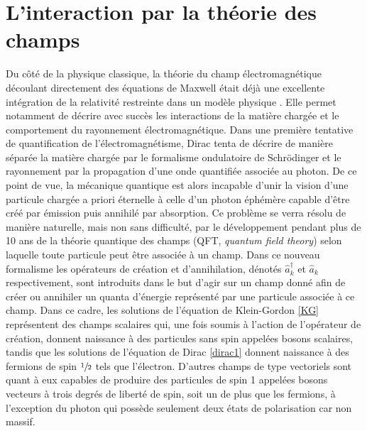         \section{L'interaction par la théorie des champs}
        \label{sectionQFT}
        
        Du côté de la physique classique, la théorie du champ électromagnétique découlant directement des équations de Maxwell était déjà une excellente intégration de la relativité restreinte dans un modèle physique \cite{Maxwell}. Elle permet notamment de décrire avec succès les interactions de la matière chargée et le comportement du rayonnement électromagnétique. Dans une première tentative de quantification de l'électromagnétisme, Dirac tenta de décrire de manière séparée la matière chargée par le formalisme ondulatoire de Schrödinger et le rayonnement par la propagation d'une onde quantifiée associée au photon. De ce point de vue, la mécanique quantique est alors incapable d'unir la vision d'une particule chargée a priori éternelle à celle d'un photon éphémère capable d'être créé par émission puis annihilé par absorption. Ce problème se verra résolu de manière naturelle, mais non sans difficulté, par le développement pendant plus de 10 ans de la théorie quantique des champs (QFT, \textit{quantum field theory}) selon laquelle toute particule peut être associée à un champ. Dans ce nouveau formalisme les opérateurs de création et d'annihilation, dénotés $\hat{a}^{\dag}_k$ et $\hat{a}_k$ respectivement, sont introduits dans le but d'agir sur un champ donné afin de créer ou annihiler un quanta d'énergie représenté par une particule associée à ce champ. Dans ce cadre, les solutions de l'équation de Klein-Gordon \ref{KG} représentent des champs scalaires qui, une fois soumis à l'action de l'opérateur de création, donnent naissance à des particules sans spin appelées bosons scalaires, tandis que les solutions de l'équation de Dirac \ref{dirac1} donnent naissance à des fermions de spin $\sfrac{1}{2}$ tels que l'électron. D'autres champs de type vectoriels sont quant à eux capables de produire des particules de spin 1 appelées bosons vecteurs à trois degrés de liberté de spin, soit un de plus que les fermions, à l'exception du photon qui possède seulement deux états de polarisation car non massif. \\
        
